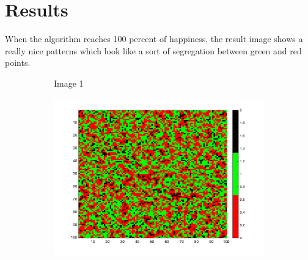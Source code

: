 \documentclass[unicode,11pt,a4paper,oneside,numbers=endperiod,openany]{scrartcl}
\begin{document}
\section*{Results}
When the algorithm reaches 100 percent of happiness, the result image shows a really nice patterns which look like a sort of segregation between green and red points. 
\begin{figure}[H]
    
    \begin{subfigure}[b]{0.3\textwidth}
      \caption{Image 1}
      \label{fig:image1}
    \end{subfigure}
    \begin{subfigure}[b]{0.3\textwidth}
        \includegraphics[width=\textwidth]{results/iterations_16_H_2_random_1.png}

\end{subfigure}
\end{figure}
\end{document}
